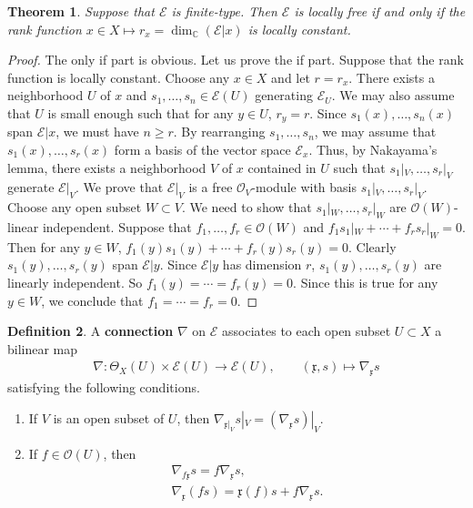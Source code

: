 \documentclass[12pt,b5paper,notitlepage]{report}
\theoremstyle{definition}
\newtheorem{df}{Definition}[section]
\theoremstyle{plain}
\newtheorem{thm}[df]{Theorem}
\newcommand{\fk}{\mathfrak}
\newcommand{\scr}{\mathscr}
\newcommand{\mbb}{\mathbb}
\numberwithin{equation}{section}
\begin{document}
\begin{thm}\label{lb59}
Suppose that $\scr E$ is finite-type. Then $\scr E$ is locally free if and only if the rank function $x\in X\mapsto r_x=\dim_{\mbb C}(\scr E|x)$ is locally constant.
\end{thm}

\begin{proof}
The only if part is obvious. Let us prove the if part. Suppose that the rank function is locally constant. Choose any $x\in X$ and let $r=r_x$. There exists a neighborhood $U$ of $x$ and $s_1,\dots,s_n\in\scr E(U)$ generating $\scr E_U$. We may also assume that $U$ is small enough such that for any $y\in U$, $r_y=r$. Since $s_1(x),\dots,s_n(x)$ span $\scr E|x$, we must have $n\geq r$. By rearranging $s_1,\dots,s_n$, we may assume that $s_1(x),\dots,s_r(x)$ form a basis of the vector space $\scr E_x$. Thus, by Nakayama's lemma, there exists a neighborhood $V$ of $x$ contained in $U$ such that $s_1|_V,\dots,s_r|_V$ generate $\scr E|_V$. We prove that $\scr E|_V$ is a free $\scr O_V$-module with basis $s_1|_V,\dots,s_r|_V$. Choose any open subset $W\subset V$. We need to show that $s_1|_W,\dots,s_r|_W$ are $\scr O(W)$-linear independent. Suppose that $f_1,\dots,f_r\in\scr O(W)$ and $f_1s_1|_W+\cdots+f_rs_r|_W=0$. Then for any $y\in W$, $f_1(y)s_1(y)+\cdots+f_r(y)s_r(y)=0$. Clearly $s_1(y),\dots,s_r(y)$ span $\scr E|y$. Since $\scr E|y$ has dimension $r$, $s_1(y),\dots,s_r(y)$ are linearly independent. So $f_1(y)=\cdots=f_r(y)=0$. Since this is true for any $y\in W$, we conclude that $f_1=\cdots=f_r=0$. 
\end{proof}









\begin{df}\label{lb49}
A \textbf{connection} $\nabla$ on $\scr E$ associates to each open subset $U\subset X$ a bilinear map
\begin{gather*}
\nabla:\Theta_X(U)\times\scr E(U)\rightarrow\scr E(U),\qquad (\fk x,s)\mapsto \nabla_{\fk x} s
\end{gather*}
satisfying the following conditions.

\begin{enumerate}[label=(\alph*)]
\item If $V$ is an open subset of $U$, then $\nabla_{\fk x|_V}s|_V=(\nabla_{\fk x} s)|_V$.
\item If $f\in\scr O
(U)$, then
\begin{gather*}
\nabla_{f\fk x}s=f\nabla_{\fk x}s,\\
\nabla_{\fk x}(fs)=\fk x(f)s+f\nabla_{\fk x}s.
\end{gather*}
\end{enumerate}
\end{df}
\end{document}
